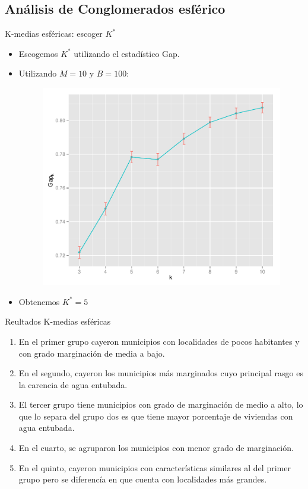 \documentclass{beamer}
\begin{document}

\subsection{Análisis de Conglomerados esférico}
\begin{frame}{K-medias esféricas: escoger $K^*$}
  \begin{itemize}
  \item Escogemos $K^*$ utilizando el estadístico Gap.
  \item Utilizando $M=10$ y $B=100$:
  \begin{figure}[!htb]
    \centering
    \includegraphics[width=.6\textwidth]{./plots/gap_plot.pdf}
  \end{figure}
  \item Obtenemos $K^*=5$
  \end{itemize}
\end{frame}

\begin{frame}{Reultados K-medias esféricas}
  \begin{enumerate}
  \item En el primer grupo cayeron municipios con localidades de pocos habitantes y con grado marginación de media a bajo. 
  \item En el segundo, cayeron los municipios más marginados cuyo principal rasgo es la carencia de agua entubada.
  \item El tercer grupo tiene municipios con grado de marginación de medio a alto, lo que lo separa del grupo dos es que tiene mayor porcentaje de viviendas con agua entubada.
  \item En el cuarto, se agruparon los municipios con menor grado de marginación.
  \item En el quinto, cayeron municipios con características similares al del primer grupo pero se diferencía en que cuenta con localidades más grandes.
  \end{enumerate}
\end{frame}
\end{document}
